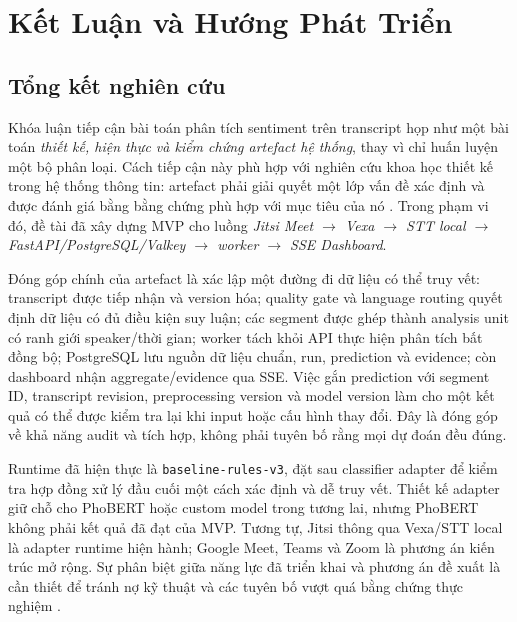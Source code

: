 \chapter{Kết Luận và Hướng Phát Triển}
\label{chap:conclusion}

\section{Tổng kết nghiên cứu}
Khóa luận tiếp cận bài toán phân tích sentiment trên transcript họp như một bài toán \emph{thiết kế, hiện thực và kiểm chứng artefact hệ thống}, thay vì chỉ huấn luyện một bộ phân loại. Cách tiếp cận này phù hợp với nghiên cứu khoa học thiết kế trong hệ thống thông tin: artefact phải giải quyết một lớp vấn đề xác định và được đánh giá bằng bằng chứng phù hợp với mục tiêu của nó \cite{hevner2004}. Trong phạm vi đó, đề tài đã xây dựng MVP cho luồng \emph{Jitsi Meet $\rightarrow$ Vexa $\rightarrow$ STT local $\rightarrow$ FastAPI/PostgreSQL/Valkey $\rightarrow$ worker $\rightarrow$ SSE Dashboard}.

Đóng góp chính của artefact là xác lập một đường đi dữ liệu có thể truy vết: transcript được tiếp nhận và version hóa; quality gate và language routing quyết định dữ liệu có đủ điều kiện suy luận; các segment được ghép thành analysis unit có ranh giới speaker/thời gian; worker tách khỏi API thực hiện phân tích bất đồng bộ; PostgreSQL lưu nguồn dữ liệu chuẩn, run, prediction và evidence; còn dashboard nhận aggregate/evidence qua SSE. Việc gắn prediction với segment ID, transcript revision, preprocessing version và model version làm cho một kết quả có thể được kiểm tra lại khi input hoặc cấu hình thay đổi. Đây là đóng góp về khả năng audit và tích hợp, không phải tuyên bố rằng mọi dự đoán đều đúng.

Runtime đã hiện thực là \texttt{baseline-rules-v3}, đặt sau classifier adapter để kiểm tra hợp đồng xử lý đầu cuối một cách xác định và dễ truy vết. Thiết kế adapter giữ chỗ cho PhoBERT hoặc custom model trong tương lai, nhưng PhoBERT không phải kết quả đã đạt của MVP. Tương tự, Jitsi thông qua Vexa/STT local là adapter runtime hiện hành; Google Meet, Teams và Zoom là phương án kiến trúc mở rộng. Sự phân biệt giữa năng lực đã triển khai và phương án đề xuất là cần thiết để tránh nợ kỹ thuật và các tuyên bố vượt quá bằng chứng thực nghiệm \cite{sculley2015}.

